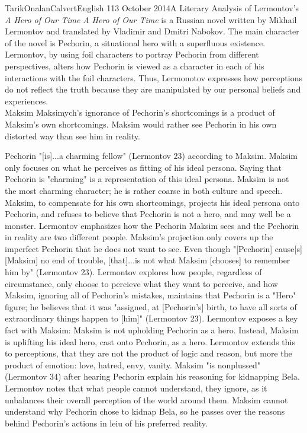 \documentclass[12pt,a4paper]{article}
\begin{document}
    \begin{mla}{Tarik}{Onalan}{Calvert}{English 1}{13 October 2014}{A Literary Analysis of Lermontov's \textit{A Hero of Our Time}}
        \textit{A Hero of Our Time} is a Russian novel written by Mikhail Lermontov
        and translated by Vladimir and Dmitri Nabokov. The main character of the
        novel is Pechorin, a situational hero with a superfluous existence. Lermontov,
        by using foil characters to portray Pechorin from different perspectives,
        alters how Pechorin is viewed as a character in each of his interactions
        with the foil characters. Thus, Lermonotov expresses how perceptions do not
        reflect the truth because they are manipulated by our personal beliefs and
        experiences.\\

        Maksim Maksimych's ignorance of Pechorin's shortcomings is a product of Maksim's
        own shortcomings. Maksim would rather see Pechorin in his own distorted way
        than see him in reality.

        Pechorin "[is]...a charming fellow" (Lermontov 23) according to Maksim.
        Maksim only focuses on what he perceives as fitting of his ideal persona.
        Saying that Pechorin is "charming" is a representation of this ideal
        persona. Maksim is not the most charming character; he is rather coarse in
        both culture and speech. Maksim, to compensate for his own shortcomings,
        projects his ideal persona onto Pechorin, and refuses to believe that Pechorin
        is not a hero, and may well be a monster. Lermontov emphasizes how the Pechorin
        Maksim sees and the Pechorin in reality are two different people. Maksim's projection
        only covers up the imperfect Pechorin that he does not want to see. Even
        though "[Pechorin] cause[s] [Maksim] no end of trouble, [that]...is not what
        Maksim [chooses] to remember him by" (Lermontov 23). Lermontov explores how
        people, regardless of circumstance, only choose to percieve what they want to
        perceive, and how Maksim, ignoring all of Pechorin's mistakes, maintains that
        Pechorin is a "Hero" figure; he believes that it was "assigned, at [Pechorin's]
        birth, to have all sorts of extraordinary things happen to [him]" (Lermontov 23).
        Lermontov exposes a key fact with Maksim: Maksim is not upholding Pechorin as a
        hero. Instead, Maksim is uplifting his ideal hero, cast onto Pechorin, as a hero.
        Lermontov extends this to perceptions, that they are not the product of logic
        and reason, but more the product of emotion: love, hatred, envy, vanity. Maksim
        "is nonplussed" (Lermontov 34) after hearing Pechorin explain his reasoning for
        kidnapping Bela. Lermontov notes that what people cannot understand, they ignore,
        as it unbalances their overall perception of the world around them. Maksim
        cannot understand why Pechorin chose to kidnap Bela, so he passes over the
        reasons behind Pechorin's actions in leiu of his preferred reality.\\


\end{mla}
\end{document}
